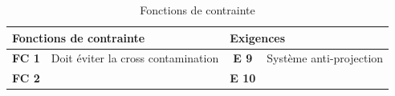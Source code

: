 \begin{table}[H]
  \centering
  \begin{tabular}{cl|cl}
  \multicolumn{2}{l|}{\textbf{Fonctions de contrainte}}                   & \multicolumn{2}{l}{\textbf{Exigences}}                       \\ \hline
  \multicolumn{1}{c|}{\textbf{FC 1}} & Doit éviter la cross contamination & \multicolumn{1}{c|}{\textbf{E 9}}  & Système anti-projection \\ \hline
  \multicolumn{1}{c|}{\textbf{FC 2}} &                                    & \multicolumn{1}{c|}{\textbf{E 10}} &                        
  \end{tabular}
  \caption{Fonctions de contrainte}
  \label{tab:fctscontr}
  \end{table}






